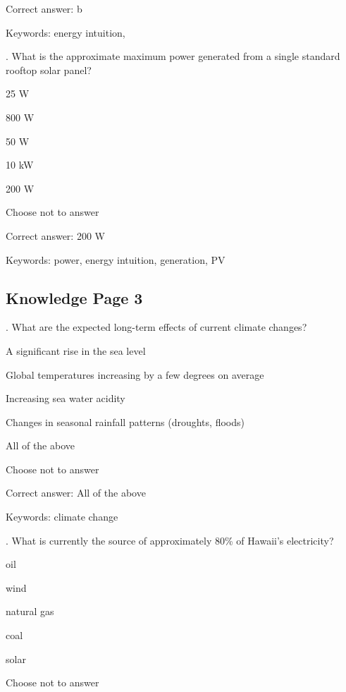 Correct answer: b

Keywords: energy intuition, \Hawaii

\vspace{5 mm}
. What is the approximate maximum power generated from a single standard rooftop solar panel?

\begin{answer}
	\item 25 W
	\item 800 W
	\item 50 W
	\item 10 kW
	\item 200 W
	\item Choose not to answer
\end{answer}

Correct answer: 200 W

Keywords: power, energy intuition, generation, PV


\subsection{Knowledge Page 3}

. What are the expected long-term effects of current climate changes?

\begin{answer}
	\item A significant rise in the sea level
	\item Global temperatures increasing by a few degrees on average
	\item Increasing sea water acidity
	\item Changes in seasonal rainfall patterns (droughts, floods)
	\item All of the above
	\item Choose not to answer
\end{answer}

Correct answer: All of the above

Keywords: climate change

\vspace{5 mm}
. What is currently the source of approximately 80\% of Hawaii's electricity?

\begin{answer}
	\item oil
	\item wind
	\item natural gas
	\item coal
	\item solar
	\item Choose not to answer
\end{answer}

